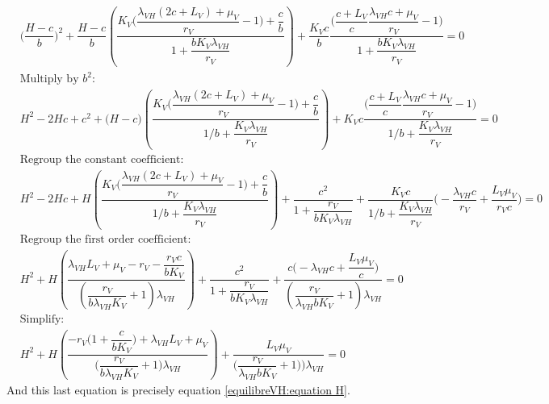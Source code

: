 \documentclass{article}
\newcommand{\lv}{\lambda_{VH}}
\begin{document}
\begin{appendices}
\begin{subequations}
\begin{align*}
& \Big(\dfrac{H-c}{b} \Big)^2 + \dfrac{H-c}{b} \left(\dfrac{K_V\Big(\dfrac{\lv(2c+L_V) + \mu_V}{r_V} - 1\Big) + \dfrac{c}{b}}{1 + \dfrac{b K_V \lv}{r_V}}  \right) + \dfrac{K_Vc}{b} \dfrac{\Big(\dfrac{c+L_V}{c} \dfrac{\lv c + \mu_V}{r_V} - 1\Big)}{1 + \dfrac{b K_V \lv}{r_V}} = 0 \\
&\text{Multiply by $b^2$:} \\
& H^2 -2Hc + c^2 + \Big(H-c\Big) \left(\dfrac{K_V\Big(\dfrac{\lv(2c+L_V) + \mu_V}{r_V} - 1\Big) + \dfrac{c}{b}}{1/b + \dfrac{K_V \lv}{r_V}}  \right) + K_Vc \dfrac{\Big(\dfrac{c+L_V}{c} \dfrac{\lv c + \mu_V}{r_V} - 1\Big)}{1/b + \dfrac{K_V \lv}{r_V}} = 0 \\
&\text{Regroup the constant coefficient:} \\
& H^2 -2Hc + H\left(\dfrac{K_V\Big(\dfrac{\lv(2c+L_V) + \mu_V}{r_V} - 1\Big) +  \dfrac{c}{b}}{1/b + \dfrac{K_V \lv}{r_V}}  \right) + \dfrac{c^2}{1 + \dfrac{r_V}{b K_V \lv}} + \dfrac{K_Vc}{1/b + \dfrac{K_V \lv}{r_V}} \Big(-\dfrac{\lv c}{r_V} + \dfrac{L_V \mu_V}{r_V c}\Big) = 0 \\
&\text{Regroup the first order coefficient:} \\
& H^2 + H\left(\dfrac{ \lv L_V + \mu_V - r_V -  \dfrac{r_V c}{bK_V}}{(\dfrac{r_V}{b \lv K_V} + 1 )\lv}  \right) + \dfrac{c^2}{1 + \dfrac{r_V}{b K_V \lv}} + \dfrac{c \Big(-\lv c+ \dfrac{L_V \mu_V}{c}\Big)}{(\dfrac{r_V}{\lv bK_V} + 1)\lv}  = 0 \\
&\text{Simplify:}\\
& H^2 + H\left(\dfrac{-r_V\Big(1 + \dfrac{c}{bK_V}\Big) +  \lv L_V + \mu_V }{\Big(\dfrac{r_V}{b \lv K_V} + 1 \Big)\lv}  \right) + \dfrac{L_V \mu_V}{\Big(\dfrac{r_V}{\lv bK_V} + 1\Big))\lv}  = 0
\end{align*}
\end{subequations}
And this last equation is precisely equation \eqref{equilibreVH:equation H}.
\end{appendices}



\end{document}
